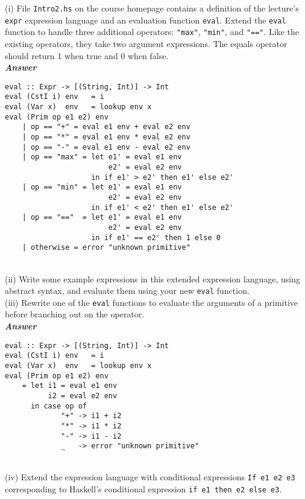 \documentclass[a4paper]{article}
\begin{document}
\begin{exercise}\label{exer-expr-more-if}
(i) File \texttt{Intro2.hs} on the course homepage contains a definition
of the lecture's \texttt{expr} expression language and an evaluation
function \texttt{eval}.  Extend the \texttt{eval} function to handle
three additional operators: \texttt{"max"}, \texttt{"min"}, and
\texttt{"=="}.  Like the existing operators, they take two argument
expressions.  The
equals operator should return 1 when true and 0 when false.\\
  
\noindent
\textbf{\emph{Answer}}
{\codesetup\begin{verbatim}
eval :: Expr -> [(String, Int)] -> Int 
eval (CstI i) env   = i
eval (Var x)  env   = lookup env x
eval (Prim op e1 e2) env 
    | op == "+" = eval e1 env + eval e2 env 
    | op == "*" = eval e1 env * eval e2 env
    | op == "-" = eval e1 env - eval e2 env
    | op == "max" = let e1' = eval e1 env  
                        e2' = eval e2 env
                    in if e1' > e2' then e1' else e2'
    | op == "min" = let e1' = eval e1 env  
                        e2' = eval e2 env
                    in if e1' < e2' then e1' else e2'
    | op == "=="  = let e1' = eval e1 env  
                        e2' = eval e2 env
                    in if e1' == e2' then 1 else 0
    | otherwise = error "unknown primitive"
\end{verbatim}}\\

\noindent 
(ii) Write some example expressions in this extended expression
language, using abstract syntax, and evaluate them using your new
\texttt{eval} function.\\

\noindent
(iii) Rewrite one of the \texttt{eval} functions to evaluate the
arguments of a primitive before branching out on the operator.\\
  
\noindent
\textbf{\emph{Answer}}
{\codesetup\begin{verbatim}
eval :: Expr -> [(String, Int)] -> Int 
eval (CstI i) env   = i
eval (Var x)  env   = lookup env x
eval (Prim op e1 e2) env 
    = let i1 = eval e1 env
          i2 = eval e2 env
      in case op of
             "+" -> i1 + i2 
             "*" -> i1 * i2
             "-" -> i1 - i2
             _   -> error "unknown primitive"
\end{verbatim}}\\

\noindent
(iv) Extend the expression language with conditional expressions
\texttt{If e1 e2 e3} corresponding to Haskell's conditional expression \texttt{if e1
  then e2 else e3}.
  

\end{exercise}
\end{document}
